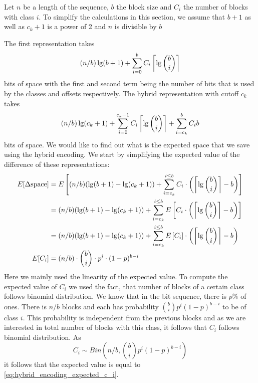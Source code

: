 Let $n$ be a length of the
sequence, $b$ the block size and $C_i$ the number of blocks with class $i$. To simplify the
calculations in this section, we assume that $b+1$ as well as $c_k+1$ is a power of 2 and
$n$ is divisible by $b$

The first representation takes $$(n/b)\lg (b+1) + \sum_{i=0}^{b} C_i\left\lceil \lg {b\choose i} \right\rceil$$
bits of space with the first and second term being the number of bits that is used by the
classes and offsets respectively. The hybrid representation with cutoff $c_k$ takes
$$(n/b)\lg (c_k+1) + \sum_{i=0}^{c_k-1}C_i\left\lceil \lg {b\choose i} \right\rceil + \sum_{i=c_k}^{b}C_i b$$
bits of space. We would like to find out what is the expected space that we save using the
hybrid encoding. We start by simplifying the expected value of the difference of these
representations:
\begin{align}
E[\Delta\text{space}] &= E\left[(n/b)(\lg(b+1)-\lg(c_k+1)) + \sum_{i=c_k}^{i\leq b}C_i\cdot \left(\left\lceil \lg{b\choose i} \right\rceil - b\right)\right] \nonumber\\
&=(n/b)(\lg(b+1)-\lg(c_k+1)) + \sum_{i=c_k}^{i\leq b}E\left[C_i\cdot \left(\left\lceil \lg{b\choose i} \right\rceil - b\right)\right] \nonumber\\
&=(n/b)(\lg(b+1)-\lg(c_k+1)) + \sum_{i=c_k}^{i\leq b}E\left[C_i\right]\cdot \left(\left\lceil \lg{b\choose i} \right\rceil - b\right) \nonumber\\
E[C_i] &= (n/b)\cdot {b\choose i}\cdot p^i\cdot (1-p)^{b-i} \label{eq:hybrid_encoding_expected_c_i}
\end{align}
Here we mainly used the linearity of the expected value. To compute the expected value of
$C_i$ we used the fact, that number of blocks of a certain class follows binomial
distribution. We know that in the bit sequence, there is $p\%$ of ones. There is $n/b$ blocks
and each has probability ${b\choose i}p^i(1-p)^{b-i}$ to be of class $i$. This probability
is independent from the previous blocks and as we are interested in total number of blocks with
this class, it follows that $C_i$ follows binomial distribution. As
$$C_i \sim Bin\left(n/b, {b\choose i}p^i(1-p)^{b-i}\right)$$ it follows that the expected value
is equal to \ref{eq:hybrid_encoding_expected_c_i}.

